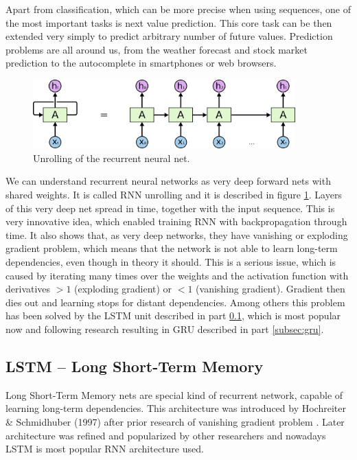 Apart from classification, which can be more precise when using sequences, one of the most important tasks is next value prediction. This core task can be then extended very simply to predict arbitrary number of future values. Prediction problems are all around us, from the weather forecast and stock market prediction to the autocomplete in smartphones or web browsers.

\begin{figure}[!ht]
	\centering
	\includegraphics[width=0.9\textwidth]{fig/RNN-unrolled.png}
	\caption{Unrolling of the recurrent neural net. \cite{colah-lstm}
		\label{fig:rnn-unroll}}
\end{figure}

We can understand recurrent neural networks as very deep forward nets with shared weights. It is called RNN unrolling and it is described in figure \ref{fig:rnn-unroll}. Layers of this very deep net spread in time, together with the input sequence. This is very innovative idea, which enabled training RNN with backpropagation through time. It also shows that, as very deep networks, they have vanishing or exploding gradient problem, which means that the network is not able to learn long-term dependencies, even though in theory it should. This is a serious issue, which is caused by iterating many times over the weights and the activation function with derivatives $>1$ (exploding gradient) or $<1$ (vanishing gradient). Gradient then dies out and learning stops for distant dependencies. Among others this problem has been solved by the LSTM unit described in part \ref{subsec:lstm}, which is most popular now and following research resulting in GRU described in part \ref{subsec:gru}.

		\subsection{LSTM -- Long Short-Term Memory}\label{subsec:lstm}

Long Short-Term Memory nets are special kind of recurrent network, capable of learning long-term dependencies. This architecture was introduced by Hochreiter \& Schmidhuber (1997) \cite{Hochreiter:1997:LSM:1246443.1246450} after prior research of vanishing gradient problem \cite{hochreiter1991untersuchungen}. Later architecture was refined and popularized by other researchers \cite{DBLP:conf/ijcnn/GersS00,DBLP:journals/neco/GersSC00} and nowadays LSTM is most popular RNN architecture used.

